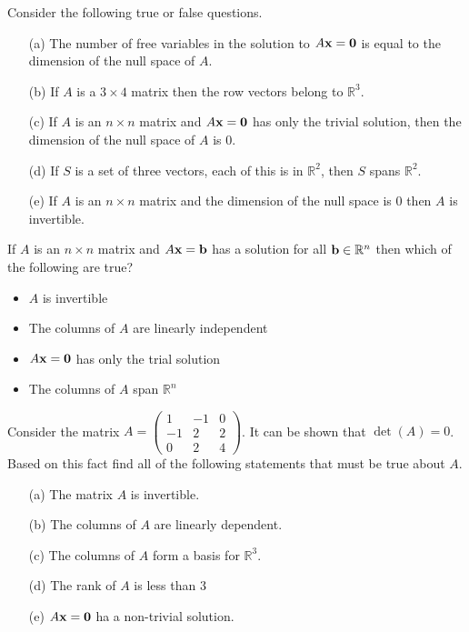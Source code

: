 \begin{problem}
    Consider the following true or false questions.
    \begin{enumerate}
        \item[(a)] The number of free variables in the solution to $A {\bf x} = {\bf 0}$ is equal
            to the dimension of the null space of $A$. 
        \item[(b)] If $A$ is a $3 \times 4$ matrix then the row vectors belong to
            $\mathbb{R}^3$. 
        \item[(c)] If $A$ is an $n \times n$ matrix and $A {\bf x} = {\bf 0}$ has only the trivial
            solution, then the dimension of the null space of $A$ is 0. 
        \item[(d)] If $S$ is a set of three vectors, each of this is in $\mathbb{R}^2$,
            then $S$ spans $\mathbb{R}^2$. 
        \item[(e)] If $A$ is an $n\times n$ matrix and the dimension of the null space is
            0 then $A$ is invertible. 
    \end{enumerate}
\end{problem}

\begin{problem}
    If $A$ is an $n \times n$ matrix and $A {\bf x} = {\bf b}$ has a solution for all ${\bf b} \in
    \mathbb{R}^n$ then which of the following are true?
    \begin{itemize}
        \item $A$ is invertible
        \item The columns of $A$ are linearly independent
        \item $A {\bf x} = {\bf 0}$ has only the trial solution
        \item The columns of $A$ span $\mathbb{R}^n$
    \end{itemize}
\end{problem}


\begin{problem}
    Consider the matrix $A = \begin{pmatrix} 1 & -1 & 0 \\ -1 & 2 & 2 \\ 0 & 2 & 4
    \end{pmatrix}$.  It can be shown that $\det(A) = 0$.  Based on this fact find all of
    the following statements that must be true about $A$.
    \begin{itemize}
        \item[(a)] The matrix $A$ is invertible.
        \item[(b)] The columns of $A$ are linearly dependent.
        \item[(c)] The columns of $A$ form a basis for $\mathbb{R}^3$.
        \item[(d)] The rank of $A$ is less than $3$
        \item[(e)] $A {\bf x} = {\bf 0}$ ha a non-trivial solution.
    \end{itemize}
\end{problem}


